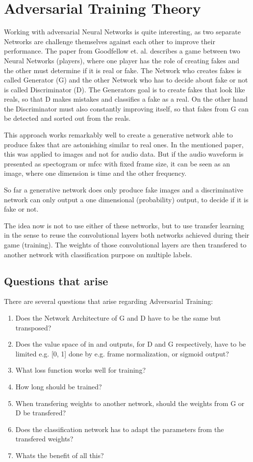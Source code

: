 
\section{Adversarial Training Theory}\label{sec:nn_adv}
Working with adversarial Neural Networks is quite interesting, as two separate Networks are challenge themselves against each other to improve their performance.
The paper from Goodfellow et. al. \cite{goodfellow2014} describes a game between two Neural Networks (players), where one player has the role of creating fakes and the other must determine if it is real or fake.
The Network who creates fakes is called Generator (G) and the other Network who has to decide about fake or not is called Discriminator (D).
The Generators goal is to create fakes that look like reals, so that D makes mistakes and classifies a fake as a real.
On the other hand the Discriminator must also constantly improving itself, so that fakes from G can be detected and sorted out from the reals.

This approach works remarkably well to create a generative network able to produce fakes that are astonishing similar to real ones.
In the mentioned paper, this was applied to images and not for audio data.
But if the audio waveform is presented as spectogram or mfcc with fixed frame size, it can be seen as an image, where one dimension is time and the other frequency.

So far a generative network does only produce fake images and a discriminative network can only output a one dimensional (probability) output, to decide if it is fake or not.

The idea now is not to use either of these networks, but to use transfer learning in the sense to reuse the convolutional layers both networks achieved during their game (training).
The weights of those convolutional layers are then transfered to another network with classification purpose on multiple labels.

\subsection{Questions that arise}
There are several questions that arise regarding Adversarial Training:
\begin{enumerate}[label={Q.\textgoth{A}.\arabic*)}, leftmargin=1.4cm]
  \item Does the Network Architecture of G and D have to be the same but transposed?
  \item Does the value space of in and outputs, for D and G respectively, have to be limited e.g. [0, 1] done by e.g. frame normalization, or sigmoid output?
  \item What loss function works well for training?
  \item How long should be trained?
  \item When transfering weights to another network, should the weights from G or D be transfered?
  \item Does the classification network has to adapt the parameters from the transfered weights?
  \item Whats the benefit of all this?
\end{enumerate}


